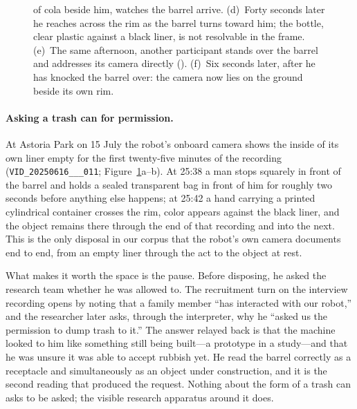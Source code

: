 \begin{figure}[t]
{  of cola beside him, watches the barrel arrive. (d)~Forty seconds later he
  reaches across the rim as the barrel turns toward him; the bottle, clear
  plastic against a black liner, is not resolvable in the frame.
  (e)~The same afternoon, another participant stands over the barrel and
  addresses its camera directly (). (f)~Six seconds later, after he has knocked the barrel over:
  the camera now lies on the ground beside its own rim.}
  \label{fig:vignettes}
\end{figure}

\paragraph{Asking a trash can for permission.}
At Astoria Park on 15 July the robot's onboard camera shows the inside of its own
liner empty for the first twenty-five minutes of the recording
(\texttt{VID\_20250616\_\_\_011};
Figure~\ref{fig:vignettes}a--b). At 25:38 a man stops squarely in front
of the barrel and holds a sealed transparent bag in front of him for roughly two
seconds before anything else happens; at 25:42 a hand carrying a printed
cylindrical container crosses the rim, color appears against the black liner, and
the object remains there through the end of that recording and into the next.
This is the only disposal in our corpus that the robot's own camera documents end
to end, from an empty liner through the act to the object at rest.

What makes it worth the space is the pause. Before disposing, he asked the
research team whether he was allowed to. The recruitment turn on the interview
recording opens by noting that a family member ``has interacted with our robot,''
and the researcher later asks, through the interpreter, why he ``asked us the
permission to dump trash to it.'' The answer relayed back is that the machine
looked to him like something still being built---a prototype in a study---and
that he was unsure it was able to accept rubbish yet. He read the barrel
correctly as a receptacle and simultaneously as an object under construction, and
it is the second reading that produced the request. Nothing about the form of a
trash can asks to be asked; the visible research apparatus around it does.

